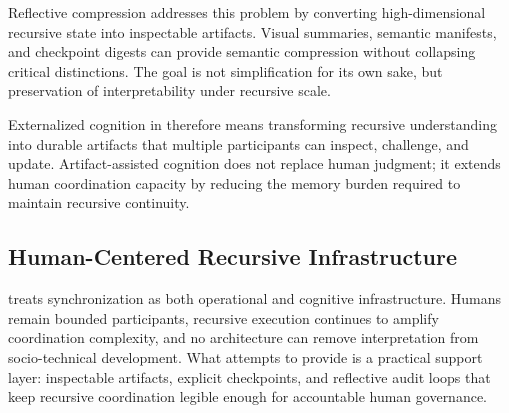Reflective compression addresses this problem by converting high-dimensional recursive state into inspectable artifacts. Visual summaries, semantic manifests, and checkpoint digests can provide semantic compression without collapsing critical distinctions. The goal is not simplification for its own sake, but preservation of interpretability under recursive scale.

Externalized cognition in  therefore means transforming recursive understanding into durable artifacts that multiple participants can inspect, challenge, and update. Artifact-assisted cognition does not replace human judgment; it extends human coordination capacity by reducing the memory burden required to maintain recursive continuity.

\subsection{Human-Centered Recursive Infrastructure}

 treats synchronization as both operational and cognitive infrastructure. Humans remain bounded participants, recursive execution continues to amplify coordination complexity, and no architecture can remove interpretation from socio-technical development. What  attempts to provide is a practical support layer: inspectable artifacts, explicit checkpoints, and reflective audit loops that keep recursive coordination legible enough for accountable human governance.

